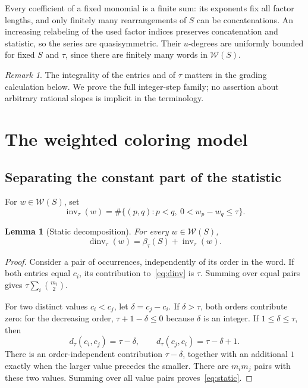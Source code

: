 \documentclass[11pt,reqno]{amsart}
\newcommand{\WW}{\mathcal W}
\newcommand{\inv}{\operatorname{inv}}
\newcommand{\dinv}{\operatorname{dinv}}
\newtheorem{lemma}[theorem]{Lemma}
\theoremstyle{definition}
\theoremstyle{remark}
\newtheorem{remark}[theorem]{Remark}
\numberwithin{equation}{section}
\begin{document}
Every coefficient of a fixed monomial is a finite sum: its exponents
fix all factor lengths, and only finitely many rearrangements of $S$
can be concatenations.  An increasing relabeling of the used factor
indices preserves concatenation and statistic, so the series are
quasisymmetric.  Their $u$-degrees are uniformly bounded for fixed $S$
and $\tau$, since there are finitely many words in $\WW(S)$.

\begin{remark}\label{rem:integer-step}
The integrality of the entries and of $\tau$ matters in the grading
calculation below.  We prove the full integer-step family; no assertion
about arbitrary rational slopes is implicit in the terminology.
\end{remark}

\section{The weighted coloring model}\label{sec:colorings}

\subsection{Separating the constant part of the statistic}
For $w\in\WW(S)$, set
\begin{equation}\label{eq:inv-tau}
 \inv_\tau(w)=\#\{(p,q):p<q,\ 0<w_p-w_q\leq\tau\}.
\end{equation}

\begin{lemma}[Static decomposition]\label{lem:static}
For every $w\in\WW(S)$,
\begin{equation}\label{eq:static}
 \dinv_\tau(w)=\beta_\tau(S)+\inv_\tau(w).
\end{equation}
\end{lemma}
\begin{proof}
Consider a pair of occurrences, independently of its order in the word.
If both entries equal $c_i$, its contribution to~\eqref{eq:dinv} is
$\tau$.  Summing over equal pairs gives
$\tau\sum_i\binom{m_i}{2}$.

For two distinct values $c_i<c_j$, let $\delta=c_j-c_i$.  If
$\delta>\tau$, both orders contribute zero: for the decreasing order,
$\tau+1-\delta\leq0$ because $\delta$ is an integer.  If
$1\leq\delta\leq\tau$, then
\[
 d_\tau(c_i,c_j)=\tau-\delta,\qquad
 d_\tau(c_j,c_i)=\tau-\delta+1.
\]
There is an order-independent contribution $\tau-\delta$, together
with an additional $1$ exactly when the larger value precedes the
smaller.  There are $m_i m_j$ pairs with these two values.  Summing over
all value pairs proves~\eqref{eq:static}.
\end{proof}
\end{document}
